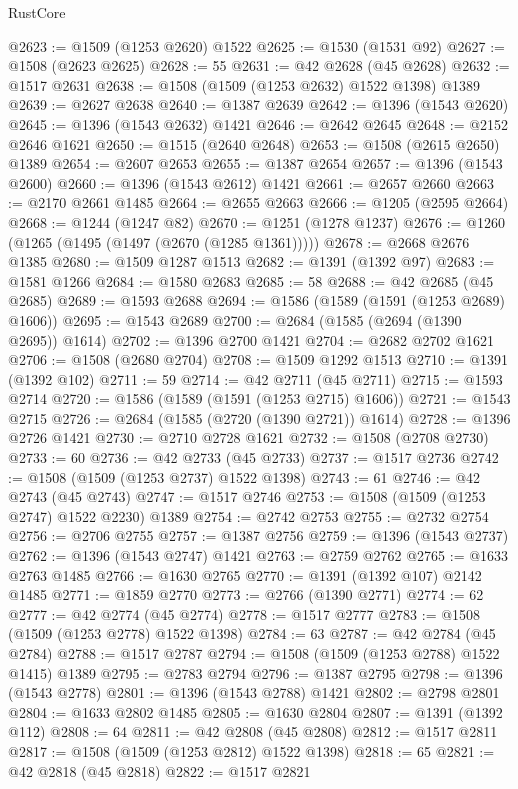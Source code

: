\begin{lexlean}{RustCore}
\begin{coremodule}
@2623 := @1509 (@1253 @2620) @1522
@2625 := @1530 (@1531 @92)
@2627 := @1508 (@2623 @2625)
@2628 := 55
@2631 := @42 @2628 (@45 @2628)
@2632 := @1517 @2631
@2638 := @1508 (@1509 (@1253 @2632) @1522 @1398) @1389
@2639 := @2627 @2638
@2640 := @1387 @2639
@2642 := @1396 (@1543 @2620)
@2645 := @1396 (@1543 @2632) @1421
@2646 := @2642 @2645
@2648 := @2152 @2646 @1621
@2650 := @1515 (@2640 @2648)
@2653 := @1508 (@2615 @2650) @1389
@2654 := @2607 @2653
@2655 := @1387 @2654
@2657 := @1396 (@1543 @2600)
@2660 := @1396 (@1543 @2612) @1421
@2661 := @2657 @2660
@2663 := @2170 @2661 @1485
@2664 := @2655 @2663
@2666 := @1205 (@2595 @2664)
@2668 := @1244 (@1247 @82)
@2670 := @1251 (@1278 @1237)
@2676 := @1260 (@1265 (@1495 (@1497 (@2670 (@1285 @1361)))))
@2678 := @2668 @2676 @1385
@2680 := @1509 @1287 @1513
@2682 := @1391 (@1392 @97)
@2683 := @1581 @1266
@2684 := @1580 @2683
@2685 := 58
@2688 := @42 @2685 (@45 @2685)
@2689 := @1593 @2688
@2694 := @1586 (@1589 (@1591 (@1253 @2689) @1606))
@2695 := @1543 @2689
@2700 := @2684 (@1585 (@2694 (@1390 @2695)) @1614)
@2702 := @1396 @2700 @1421
@2704 := @2682 @2702 @1621
@2706 := @1508 (@2680 @2704)
@2708 := @1509 @1292 @1513
@2710 := @1391 (@1392 @102)
@2711 := 59
@2714 := @42 @2711 (@45 @2711)
@2715 := @1593 @2714
@2720 := @1586 (@1589 (@1591 (@1253 @2715) @1606))
@2721 := @1543 @2715
@2726 := @2684 (@1585 (@2720 (@1390 @2721)) @1614)
@2728 := @1396 @2726 @1421
@2730 := @2710 @2728 @1621
@2732 := @1508 (@2708 @2730)
@2733 := 60
@2736 := @42 @2733 (@45 @2733)
@2737 := @1517 @2736
@2742 := @1508 (@1509 (@1253 @2737) @1522 @1398)
@2743 := 61
@2746 := @42 @2743 (@45 @2743)
@2747 := @1517 @2746
@2753 := @1508 (@1509 (@1253 @2747) @1522 @2230) @1389
@2754 := @2742 @2753
@2755 := @2732 @2754
@2756 := @2706 @2755
@2757 := @1387 @2756
@2759 := @1396 (@1543 @2737)
@2762 := @1396 (@1543 @2747) @1421
@2763 := @2759 @2762
@2765 := @1633 @2763 @1485
@2766 := @1630 @2765
@2770 := @1391 (@1392 @107) @2142 @1485
@2771 := @1859 @2770
@2773 := @2766 (@1390 @2771)
@2774 := 62
@2777 := @42 @2774 (@45 @2774)
@2778 := @1517 @2777
@2783 := @1508 (@1509 (@1253 @2778) @1522 @1398)
@2784 := 63
@2787 := @42 @2784 (@45 @2784)
@2788 := @1517 @2787
@2794 := @1508 (@1509 (@1253 @2788) @1522 @1415) @1389
@2795 := @2783 @2794
@2796 := @1387 @2795
@2798 := @1396 (@1543 @2778)
@2801 := @1396 (@1543 @2788) @1421
@2802 := @2798 @2801
@2804 := @1633 @2802 @1485
@2805 := @1630 @2804
@2807 := @1391 (@1392 @112)
@2808 := 64
@2811 := @42 @2808 (@45 @2808)
@2812 := @1517 @2811
@2817 := @1508 (@1509 (@1253 @2812) @1522 @1398)
@2818 := 65
@2821 := @42 @2818 (@45 @2818)
@2822 := @1517 @2821

\end{coremodule}
\end{lexlean}
